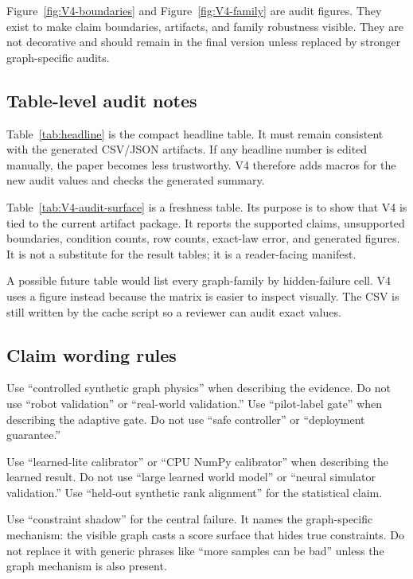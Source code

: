 \documentclass{article}
\begin{document}
Figure~\ref{fig:V4-boundaries} and Figure~\ref{fig:V4-family} are audit figures.
They exist to make claim boundaries, artifacts, and family robustness visible.
They are not decorative and should remain in the final version unless replaced
by stronger graph-specific audits.

\subsection{Table-level audit notes}

Table~\ref{tab:headline} is the compact headline table.  It must remain
consistent with the generated CSV/JSON artifacts.  If any headline number is
edited manually, the paper becomes less trustworthy.  V4 therefore adds macros
for the new audit values and checks the generated summary.

Table~\ref{tab:V4-audit-surface} is a freshness table.  Its purpose is to show
that V4 is tied to the current artifact package.  It reports the supported
claims, unsupported boundaries, condition counts, row counts, exact-law error,
and generated figures.  It is not a substitute for the result tables; it is a
reader-facing manifest.

A possible future table would list every graph-family by hidden-failure cell.
V4 uses a figure instead because the matrix is easier to inspect visually.  The
CSV is still written by the cache script so a reviewer can audit exact values.

\subsection{Claim wording rules}

Use ``controlled synthetic graph physics'' when describing the evidence.  Do not
use ``robot validation'' or ``real-world validation.''  Use ``pilot-label gate''
when describing the adaptive gate.  Do not use ``safe controller'' or
``deployment guarantee.''

Use ``learned-lite calibrator'' or ``CPU NumPy calibrator'' when describing the
learned result.  Do not use ``large learned world model'' or ``neural simulator
validation.''  Use ``held-out synthetic rank alignment'' for the statistical
claim.

Use ``constraint shadow'' for the central failure.  It names the graph-specific
mechanism: the visible graph casts a score surface that hides true constraints.
Do not replace it with generic phrases like ``more samples can be bad'' unless
the graph mechanism is also present.
\end{document}
